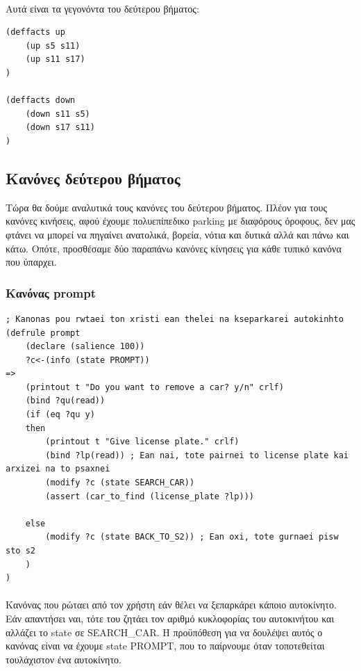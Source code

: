 \documentclass{article}
\begin{document}
    \paragraph{}
    Αυτά είναι τα γεγονόντα του δεύτερου βήματος:

    \begin{lstlisting}
(deffacts up
    (up s5 s11)
    (up s11 s17)
)

(deffacts down
    (down s11 s5)
    (down s17 s11)
)
    \end{lstlisting}

    \subsection{Κανόνες δεύτερου βήματος}
    Τώρα θα δούμε αναλυτικά τους κανόνες του δεύτερου βήματος. Πλέον για τους κανόνες κινήσεις, αφού έχουμε πολυεπίπεδικο parking με διαφόρους
    όροφους, δεν μας φτάνει να μπορεί να πηγαίνει ανατολικά, βορεία, νότια και δυτικά αλλά και πάνω και κάτω. Οπότε, προσθέσαμε δύο παραπάνω
    κανόνες κίνησεις για κάθε τυπικό κανόνα που ύπαρχει.

    \subsubsection{Κανόνας prompt}
    \begin{lstlisting}[caption=Κανόνας prompt]
; Kanonas pou rwtaei ton xristi ean thelei na kseparkarei autokinhto
(defrule prompt
    (declare (salience 100))
    ?c<-(info (state PROMPT))
=>
    (printout t "Do you want to remove a car? y/n" crlf)
    (bind ?qu(read))
    (if (eq ?qu y)
    then
        (printout t "Give license plate." crlf)
        (bind ?lp(read)) ; Ean nai, tote pairnei to license plate kai arxizei na to psaxnei
        (modify ?c (state SEARCH_CAR))
        (assert (car_to_find (license_plate ?lp)))

    else
        (modify ?c (state BACK_TO_S2)) ; Ean oxi, tote gurnaei pisw sto s2
    )
)
    \end{lstlisting}

    \paragraph{}
    Κανόνας που ρώταει από τον χρήστη εάν θέλει να ξεπαρκάρει κάποιο αυτοκίνητο. Εάν απαντήσει ναι, τότε του ζητάει τον αριθμό κυκλοφορίας
    του αυτοκινήτου και αλλάζει το state σε SEARCH\_CAR. Η προϋπόθεση για να δουλέψει αυτός ο κανόνας είναι να έχουμε state PROMPT,
    που το παίρνουμε όταν τοποτεθείται τουλάχιστον ένα αυτοκίνητο.
\end{document}
